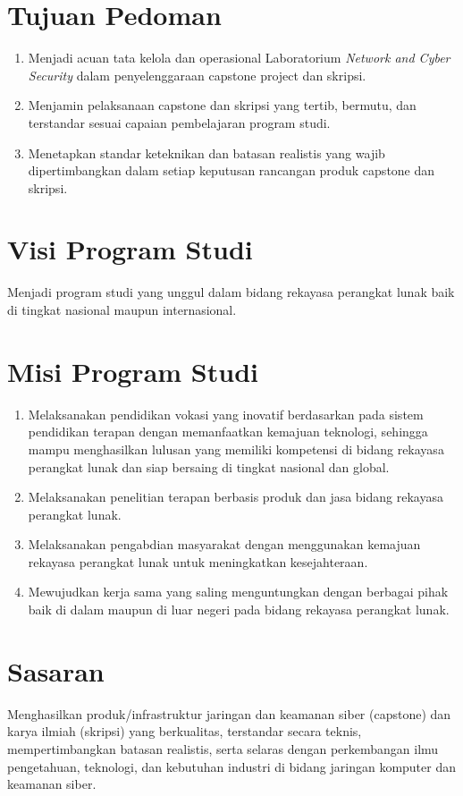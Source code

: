 \documentclass[12pt,a4paper]{report}
\begin{document}
\section{Tujuan Pedoman}
\begin{enumerate}
\item Menjadi acuan tata kelola dan operasional Laboratorium \emph{Network and Cyber Security} dalam penyelenggaraan capstone project dan skripsi.
\item Menjamin pelaksanaan capstone dan skripsi yang tertib, bermutu, dan terstandar sesuai capaian pembelajaran program studi.
\item Menetapkan standar keteknikan dan batasan realistis yang wajib dipertimbangkan dalam setiap keputusan rancangan produk capstone dan skripsi.
\end{enumerate}

\section{Visi Program Studi}
Menjadi program studi yang unggul dalam bidang rekayasa perangkat lunak baik di tingkat nasional maupun internasional.

\section{Misi Program Studi}
\begin{enumerate}
\item Melaksanakan pendidikan vokasi yang inovatif berdasarkan pada sistem pendidikan terapan dengan memanfaatkan kemajuan teknologi, sehingga mampu menghasilkan lulusan yang memiliki kompetensi di bidang re\-ka\-ya\-sa pe\-rang\-kat lu\-nak dan siap bersaing di tingkat nasional dan global.
\item Melaksanakan penelitian terapan berbasis produk dan jasa bidang rekayasa perangkat lunak.
\item Melaksanakan pengabdian masyarakat dengan menggunakan kemajuan rekayasa perangkat lunak untuk meningkatkan kesejahteraan.
\item Mewujudkan kerja sama yang saling menguntungkan dengan berbagai pihak baik di dalam maupun di luar negeri pada bidang rekayasa perangkat lunak.
\end{enumerate}

\section{Sasaran}
Menghasilkan produk/infrastruktur jaringan dan keamanan siber (capstone) dan karya ilmiah (skripsi) yang berkualitas, terstandar secara teknis, mempertimbangkan batasan realistis, serta selaras dengan perkembangan ilmu pengetahuan, teknologi, dan kebutuhan industri di bidang jaringan komputer dan keamanan siber.
\end{document}
